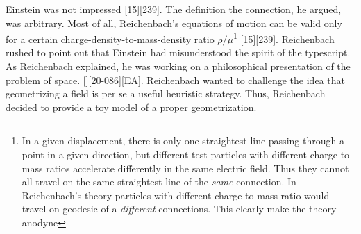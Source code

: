 \documentclass[draft]{article}
\newcommand{\ap}{\ensuremath{\tau}\xspace}
\newcommand{\xdx}{\ensuremath{x_\nu} and \ensuremath{x_\nu + dx_\nu}\xspace}
\begin{document}


Einstein was not impressed [15][239]. The definition the connection, he argued, was arbitrary. Most of all, Reichenbach's equations of motion can be valid only for a certain charge-density-to-mass-density ratio $\rho/\mu$\footnote{In a given displacement, there is only one straightest line passing through a point in a given direction, but different test particles with different charge-to-mass ratios accelerate differently in the same electric field. Thus they cannot all travel on the same straightest line of the \emph{same} connection. In Reichenbach's theory particles with different charge-to-mass-ratio would travel on geodesic of a \emph{different} connections. This clearly make the theory anodyne} [15][239]. Reichenbach rushed to point out that Einstein had misunderstood the spirit of the typescript. As Reichenbach explained, he was working on a philosophical presentation of the problem of space. [][20-086][EA]. Reichenbach wanted to challenge the idea that geometrizing a field is per se a useful heuristic strategy. Thus, Reichenbach decided to provide a toy model of a proper geometrization. 
\end{document}

